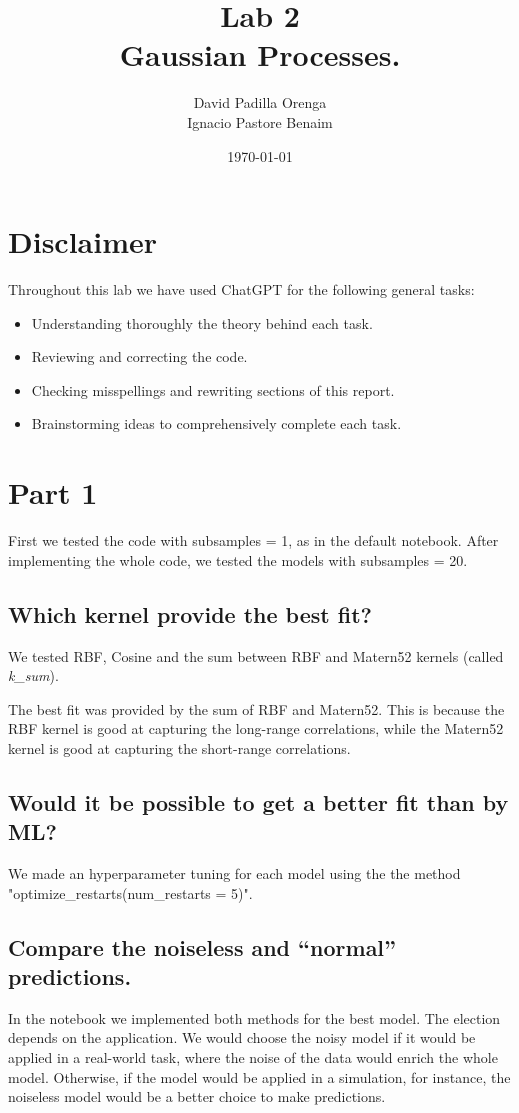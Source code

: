 \documentclass[twocolumn]{article}
\title{Lab 2 \\ \small Gaussian Processes.}
\author{David Padilla Orenga\\ Ignacio Pastore Benaim}
\date{\today}   %
\begin{document}
\maketitle

\section{Disclaimer}
Throughout this lab we have used ChatGPT for the following general tasks:
\begin{itemize}
    \item Understanding thoroughly the theory behind each task.
    \item Reviewing and correcting the code.
    \item Checking misspellings and rewriting sections of this report.
    \item Brainstorming ideas to comprehensively complete each task.
\end{itemize}

\section{Part 1}
First we tested the code with subsamples = 1, as in the default notebook. After implementing the whole
 code, we tested the models with subsamples = 20.
\subsection{Which kernel provide the best fit?}
We tested RBF, Cosine and the sum between RBF and Matern52 kernels (called \textit{k\_sum}). 

The best fit was provided by the sum of RBF and Matern52. 
This is because the RBF kernel is good at capturing the long-range correlations, 
while the Matern52 kernel is good at capturing the short-range correlations. 

\subsection{Would it be possible to get a better fit than by ML?}
We made an hyperparameter tuning for each model using the the method 
"optimize\_restarts(num\_restarts = 5)".

\subsection{Compare the noiseless and ``normal'' predictions.} 
In the notebook we implemented both methods for the best model. The election depends on the application. We would choose the noisy model 
if it would be applied in a real-world task, where the noise of the 
data would enrich the whole model. Otherwise, if the model would be applied in 
a simulation, for instance, the noiseless model would be a better choice to make predictions. 
\end{document}
